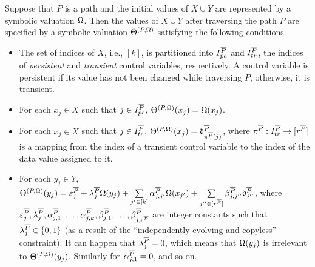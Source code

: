 \begin{proposition}\label{prop-sum-path}
Suppose that $P$ is a path and the initial values of $X \cup Y$ are represented by a symbolic valuation $\Omega$. Then the values of $X \cup Y$ after traversing the path $P$ are specified by a symbolic valuation $\Theta^{(P,\Omega)}$ satisfying the following conditions.
\begin{itemize}
\item The set of indices of $X$, i.e., $[k]$, is partitioned into $I^{\overline{P}}_{pe}$ and $I^{\overline{P}}_{tr}$, the indices of \emph{persistent} and \emph{transient} control variables, respectively. A control variable is persistent if its value has not been changed while traversing $P$, otherwise, it is transient.
\item For each $x_j\in X$ such that $j\in I^{\overline{P}}_{pe}$, $\Theta^{(P,\Omega)}(x_j)=\Omega(x_j)$.
%
\item  For each $x_j\in X$ such that $j\in I^{\overline{P}}_{tr}$,
$\Theta^{(P,\Omega)}(x_j)=\mathfrak{d}^{\overline{P}}_{\pi^{\overline{P}}(j)}$, where $\pi^{\overline{P}}: I^{\overline{P}}_{tr} \rightarrow [r^{\overline{P}}]$ is a mapping from the index of a transient control variable to the index of the data value assigned to it.
% 
\item For each $y_j \in Y$, 
$
 \Theta^{(P,\Omega)}(y_j)  =
 \varepsilon^{\overline{P}}_{j} + 
 \lambda^{\overline{P}}_j \Omega(y_j)  + 
  \sum\limits_{j'\in [k]}\alpha^{\overline{P}}_{j,j'}\Omega(x_{j'}) +
  \sum\limits_{j''\in [r^{\overline{P}}]}\beta^{\overline{P}}_{j,j''} \mathfrak{d}^{\overline{P}}_{j''}$,
where $\varepsilon^{\overline{P}}_j,\lambda^{\overline{P}}_j, \alpha^{\overline{P}}_{j,1},\dots,\alpha^{\overline{P}}_{j,k}, \beta^{\overline{P}}_{j,1},\dots,\beta^{\overline{P}}_{j,r^{\overline{P}}}$ are integer constants such that $\lambda^{\overline{P}}_{j} \in \{0,1\}$ (as a result of the ``independently evolving and copyless'' constraint).  It can happen that $\lambda^{\overline{P}}_j =0$,  which means that $\Omega(y_j)$ is irrelevant to $\Theta^{(P,\Omega)}(y_j)$. Similarly for $\alpha^{\overline{P}}_{j,1}=0$, and so on.
\end{itemize}
\end{proposition}
